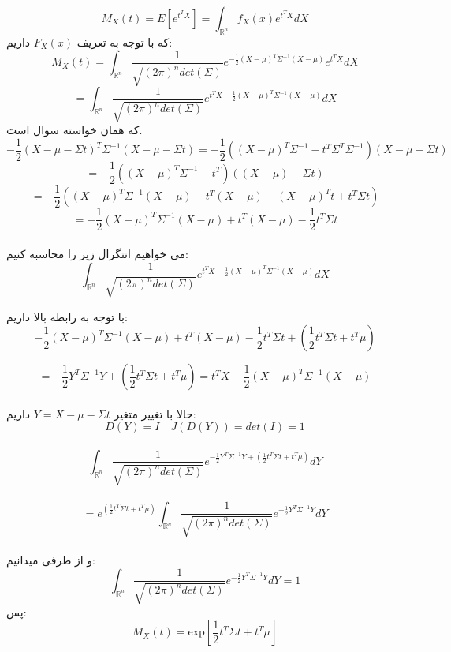 \parte{}
\[M_X(t) = E[e^{t^{T}X}] = \int_{\mathbb{R}^{n}}{f_{X}(x) e^{t^{T}X}} dX \]
که با توجه به تعریف $F_X(x)$ داریم:
\[M_X(t) =  \int_{\mathbb{R}^{n}}{\frac{1}{\sqrt{(2\pi)^n det(\Sigma)}} e^{-\frac{1}{2}(X-\mu)^{T}\Sigma^{-1}(X-\mu)} e^{t^{T}X}} dX\]
\[ = \int_{\mathbb{R}^{n}}{\frac{1}{\sqrt{(2\pi)^n det(\Sigma)}} e^{t^{T}X-\frac{1}{2}(X-\mu)^{T}\Sigma^{-1}(X-\mu)}} dX \]
که همان خواسته سوال است.\\

\parte{}
\[ -\frac{1}{2}(X-\mu-\Sigma t)^{T}\Sigma^{-1}(X-\mu-\Sigma t) 
= -\frac{1}{2}((X-\mu)^{T}\Sigma^{-1}-t^{T}\Sigma^{T}\Sigma^{-1})(X-\mu-\Sigma t) \]
\[ 
= -\frac{1}{2}((X-\mu)^{T}\Sigma^{-1}-t^{T})((X-\mu)-\Sigma t) 
\]
\[ 
= -\frac{1}{2}((X-\mu)^{T}\Sigma^{-1}(X-\mu) -t^{T}(X-\mu) - (X-\mu)^{T}t +t^{T}\Sigma t)
\]
\[
= -\frac{1}{2}(X-\mu)^{T}\Sigma^{-1}(X-\mu) + t^{T}(X-\mu) -\frac{1}{2}t^{T}\Sigma t
\]\\

\parte{}
می خواهیم انتگرال زیر را محاسبه کنیم:
\[ \int_{\mathbb{R}^{n}}{\frac{1}{\sqrt{(2\pi)^n det(\Sigma)}} e^{t^{T}X-\frac{1}{2}(X-\mu)^{T}\Sigma^{-1}(X-\mu)}} dX \]

با توجه به رابطه بالا داریم:\\

\[
    -\frac{1}{2}(X-\mu)^{T}\Sigma^{-1}(X-\mu) + t^{T}(X-\mu) -\frac{1}{2}t^{T}\Sigma t
    +(\frac{1}{2}t^{T}\Sigma t + t^{T}\mu)
\]

\[
= -\frac{1}{2}Y^{T}{\Sigma}^{-1}Y +(\frac{1}{2}t^{T}\Sigma t + t^{T}\mu)
= t^{T}X-\frac{1}{2}(X-\mu)^{T}\Sigma^{-1}(X-\mu)
\]\\

حالا با تغییر متغیر $Y=X-\mu-\Sigma t$ داریم:\\

\[ 
    D(Y) = I \quad J(D(Y)) = det(I) = 1
\]\\

\[ 
    \int_{\mathbb{R}^{n}}{\frac{1}{\sqrt{(2\pi)^n det(\Sigma)}} e^{-\frac{1}{2}Y^{T}{\Sigma}^{-1}Y +(\frac{1}{2}t^{T}\Sigma t + t^{T}\mu)}} dY 
\]\\

\[
    = e^{(\frac{1}{2}t^{T}\Sigma t + t^{T}\mu)}\int_{\mathbb{R}^{n}}{\frac{1}{\sqrt{(2\pi)^n det(\Sigma)}} e^{-\frac{1}{2}Y^{T}{\Sigma}^{-1}Y }} dY 
\]\\
و از طرفی میدانیم:\\
\[ \int_{\mathbb{R}^{n}}{\frac{1}{\sqrt{(2\pi)^n det(\Sigma)}} e^{-\frac{1}{2}Y^{T}{\Sigma}^{-1}Y }} dY  = 1\]
پس:\\
\[ M_X(t) = \text{exp}[\frac{1}{2}t^{T}\Sigma t + t^{T}\mu]\]
\\\\